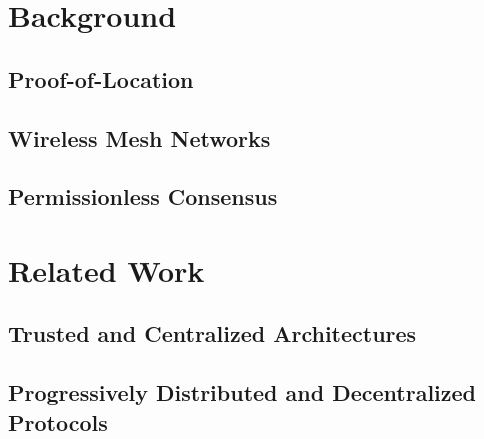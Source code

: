 \documentclass[12pt]{article}
\begin{document}


\newpage
\section{Background} \label{sec:background}



\subsection{Proof-of-Location} \label{sec:background-proof-of-location}



\subsection{Wireless Mesh Networks} \label{sec:background-wireless-mesh-networks}



\subsection{Permissionless Consensus} \label{sec:background-permissionless-consensus}



\newpage
\section{Related Work} \label{sec:related-work}



\subsection{Trusted and Centralized Architectures} \label{sec:related-work-trusted-centralized}



\subsection{Progressively Distributed and Decentralized Protocols} \label{sec:related-work-distributed-decentralized}


\end{document}
